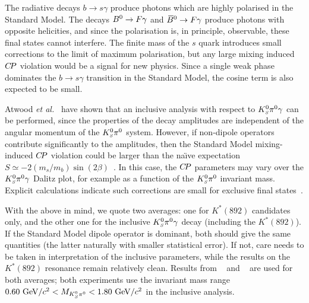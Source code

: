 \clearpage
{}
\label{sec:cp_uta:bsg}

The radiative decays $b \to s\gamma$ produce photons 
which are highly polarised in the Standard Model.
The decays $B^0 \to F \gamma$ and $\kern 0.18em\overline{\kern -0.18em B}{}^0 \to F \gamma$ 
produce photons with opposite helicities, 
and since the polarisation is, in principle, observable,
these final states cannot interfere.
The finite mass of the $s$ quark introduces small corrections
to the limit of maximum polarisation,
but any large mixing induced $C\!P$ violation would be a signal for new physics.
Since a single weak phase dominates the $b \to s \gamma$ transition in the 
Standard Model, the cosine term is also expected to be small.

Atwood {\it et al.}~\cite{Atwood:2004jj} have shown that 
an inclusive analysis with respect to $K^0_{\scriptscriptstyle S}\pi^0\gamma$ can be performed,
since the properties of the decay amplitudes 
are independent of the angular momentum of the $K^0_{\scriptscriptstyle S}\pi^0$ system. 
However, if non-dipole operators contribute significantly to the amplitudes, 
then the Standard Model mixing-induced $C\!P$ violation could be larger 
than the na\"\i ve expectation 
$S \simeq -2 (m_s/m_b) \sin \left(2\beta\right)$~\cite{Grinstein:2004uu,Grinstein:2005nu}.
In this case, 
the $C\!P$ parameters may vary over the $K^0_{\scriptscriptstyle S}\pi^0\gamma$ Dalitz plot, 
for example as a function of the $K^0_{\scriptscriptstyle S}\pi^0$ invariant mass.
Explicit calculations indicate such corrections are small
for exclusive final states~\cite{Matsumori:2005ax,Ball:2006cva}.

With the above in mind, 
we quote two averages: one for $K^*(892)$ candidates only, 
and the other one for the inclusive $K^0_{\scriptscriptstyle S}\pi^0\gamma$ decay (including the $K^*(892)$).
If the Standard Model dipole operator is dominant, 
both should give the same quantities 
(the latter naturally with smaller statistical error). 
If not, care needs to be taken in interpretation of the inclusive parameters, 
while the results on the $K^*(892)$ resonance remain relatively clean.
Results from \babar~\cite{Aubert:2008gy} and \belle~\cite{Ushiroda:2006fi} are
used for both averages; both experiments use the invariant mass range 
$0.60 \ {\rm GeV}/c^2 < M_{K^0_{\scriptscriptstyle S}\pi^0} < 1.80 \ {\rm GeV}/c^2$
in the inclusive analysis.

